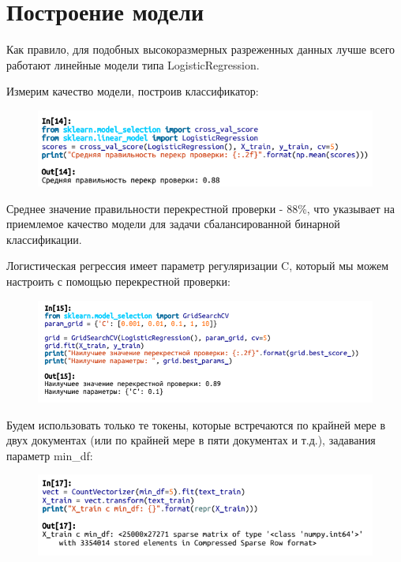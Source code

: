 \documentclass{beamer}
\begin{document}
\section{Построение модели}

\begin{frame}
Как правило, для подобных высокоразмерных разреженных данных лучше всего работают линейные модели типа LogisticRegression. 

Измерим качество модели, построив классификатор: 
\begin{figure}[h]
\centering
\includegraphics[scale=0.75]{images/lec09-pic14.png}
\end{figure}
Среднее значение правильности перекрестной проверки - 88\%, что указывает на приемлемое качество модели для задачи сбалансированной бинарной классификации.
\end{frame}

\begin{frame}
Логистическая регрессия имеет параметр регуляризации C, который мы можем настроить с помощью перекрестной проверки: 
\begin{figure}[h]
\centering
\includegraphics[scale=0.75]{images/lec09-pic15.png}
\end{figure}
\end{frame}

\begin{frame}
Будем использовать только те токены, которые встречаются по крайней мере в двух документах (или по крайней мере в пяти документах и т.д.), задавания параметр min\_df: 
\begin{figure}[h]
\centering
\includegraphics[scale=0.75]{images/lec09-pic16.png}
\end{figure}
\end{frame}
\end{document}

